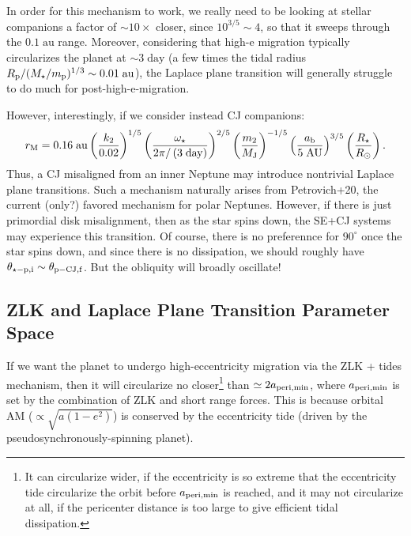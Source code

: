 \documentclass[11pt,
        usenames, %
        dvipsnames %
    ]{article}
\newcommand*{\p}[1]{\left(#1\right)}
\begin{document}
In order for this mechanism to work, we really need to be looking at stellar
companions a factor of $\sim 10 \times$ closer, since $10^{3/5} \sim 4$, so that
it sweeps through the $0.1\;\mathrm{au}$ range.
Moreover, considering that high-e migration typically circularizes the planet at
$\sim 3\;\mathrm{day}$ (a few times the tidal radius $R_{\rm p} / (M_\star /
m_{\rm p})^{1/3} \sim 0.01\;\mathrm{au}$), the Laplace plane transition will
generally struggle to do much for post-high-e-migration.

However, interestingly, if we consider instead CJ companions:
\begin{equation}
    r_{\rm M}
        = 0.16\;\mathrm{au}
            \p{\frac{k_2}{0.02}}^{1/5}
            \p{\frac{\omega_\star}{2\pi / \p{3\;\mathrm{day}}}}^{2/5}
            \p{\frac{m_2}{M_{\rm J}}}^{-1/5}
            \p{\frac{a_{\rm b}}{5\;\mathrm{AU}}}^{3/5}
            \p{\frac{R_\star}{R_{\odot}}}.
\end{equation}
Thus, a CJ misaligned from an inner Neptune may introduce nontrivial Laplace
plane transitions.
Such a mechanism naturally arises from Petrovich+20, the current (only?) favored
mechanism for polar Neptunes.
However, if there is just primordial disk misalignment, then as the star spins
down, the SE+CJ systems may experience this transition.
Of course, there is no preferennce for $90^\circ$ once the star spins down, and
since there is no dissipation, we should roughly have $\theta_{\rm \star-p, i}
\sim \theta_{\rm p-CJ, f}$.
But the obliquity will broadly oscillate!

\clearpage

\subsection{ZLK and Laplace Plane Transition Parameter Space}

If we want the planet to undergo high-eccentricity migration via the ZLK +
tides mechanism, then it will circularize no closer\footnote{It can circularize
wider, if the eccentricity is so extreme that the eccentricity tide circularize
the orbit before $a_{\rm  peri, \min}$ is reached, and it may not circularize at
all, if the pericenter distance is too large to give efficient tidal
dissipation.} than $\simeq 2a_{\rm peri, \min}$, where $a_{\rm peri, \min}$ is
set by the combination of ZLK and short range forces.
This is because orbital AM ($\propto \sqrt{a(1 - e^2)}$) is conserved by the
eccentricity tide (driven by the pseudosynchronously-spinning planet).
\end{document}

